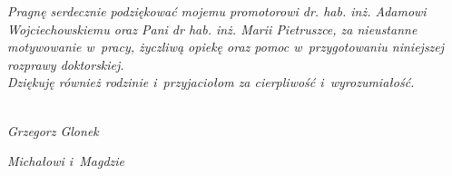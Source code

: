 \cleardoublepage
{}
{}
\vspace*{\fill}



\textit{Pragnę serdecznie podziękować mojemu promotorowi dr. hab. inż. Adamowi Wojciechowskiemu oraz Pani dr hab. inż. Marii Pietruszce, za nieustanne motywowanie w~pracy, życzliwą opiekę oraz pomoc w~przygotowaniu niniejszej rozprawy doktorskiej.}\\
\textit{Dziękuję również rodzinie i~przyjaciołom za cierpliwość i~wyrozumiałość.}\\\\
\begin{flushright}
	\textit{Grzegorz Glonek}
\end{flushright}
\vspace*{\fill}

\cleardoublepage
{}
{}
\vspace*{\fill}
\begin{flushright}
	\textit{Michałowi i~Magdzie}
\end{flushright}
\vspace*{\fill}
